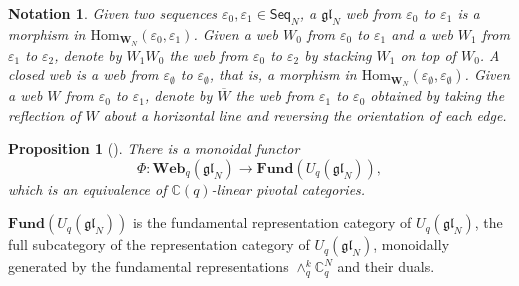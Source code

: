 \documentclass[12pt]{amsart}
\newtheorem{proposition}[theorem]{Proposition}
\newtheorem{notation}[theorem]{Notation}
\theoremstyle{definition}
\theoremstyle{remark}
\numberwithin{equation}{section}
\numberwithin{figure}{section}
\newcommand{\GL}{\mathfrak{gl}}
\newcommand{\webcat}{\mathbf{Web}}
\newcommand{\Web}{\mathbf{W}_N}
\newcommand{\Hom}{\mathrm{Hom}}
\newcommand{\Fund}{\mathbf{Fund}}
\newcommand{\emptylist}{\varepsilon_{\emptyset}}
\newcommand{\Seq}{\mathsf{Seq}}
\begin{document}
\begin{notation}
    Given two sequences $\varepsilon_0,\varepsilon_1\in \Seq_{N}$, a $\GL_{N}$ web from $\varepsilon_0$ to $\varepsilon_1$ is a morphism in ${\Hom}_{\Web}(\varepsilon_0,\varepsilon_1)$. Given a web $W_0$ from $\varepsilon_0$ to $\varepsilon_1$ and a web $W_1$ from $\varepsilon_1$ to $\varepsilon_2$, denote by $W_1W_0$ the web from $\varepsilon_0$ to $\varepsilon_2$ by stacking $W_1$ on top of $W_0$. A \emph{closed web} is a web from $\emptylist$ to $\emptylist$, that is, a morphism in ${\Hom}_{\Web}(\emptylist,\emptylist)$. Given a web $W$ from $\varepsilon_0$ to $\varepsilon_1$, denote by $\overline{W}$ the web from $\varepsilon_1$ to $\varepsilon_0$ obtained by taking the reflection of $W$ about a horizontal line and reversing the orientation of each edge.
\end{notation}

\begin{proposition}[{\cite[Theorem 3.3.1]{CKM2014}}]
\label{WebRep}
There is a monoidal functor
\[
\Phi:\webcat_q(\GL_{N}) \rightarrow \Fund (U_q(\GL_{N})),
\]
which is an equivalence of $\mathbb{C}(q)$-linear pivotal categories.
\end{proposition}

$\Fund(U_q(\GL_N))$ is the fundamental representation category of $U_q(\GL_N)$, the full subcategory of the representation category of $U_q(\GL_N)$, monoidally generated by the fundamental representations $\wedge_q^k\mathbb{C}_q^N$ and their duals.
\end{document}
